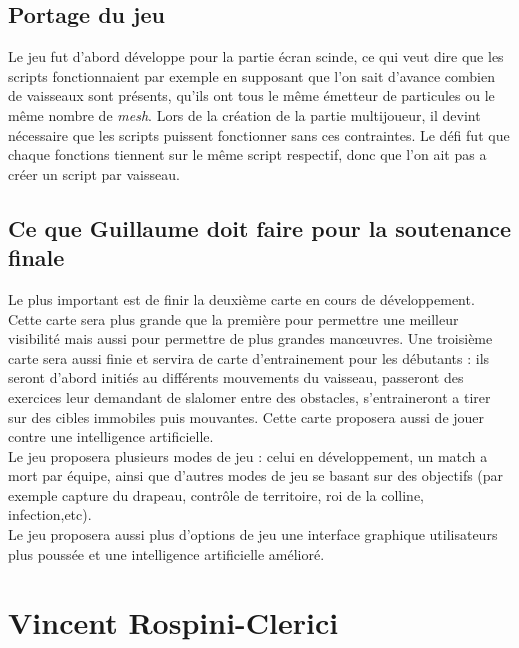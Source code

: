 \documentclass[10pt, titlepage]{report}
\begin{document}
\subsection{Portage du jeu}

Le jeu fut d'abord développe pour la partie écran scinde, ce qui veut dire que les scripts fonctionnaient par exemple en supposant que l'on sait d'avance combien de vaisseaux sont présents, qu'ils ont tous le même émetteur de particules  ou le même nombre de \textit{mesh}. Lors de la création de la partie multijoueur, il devint nécessaire que les scripts puissent fonctionner sans ces contraintes. Le défi fut que chaque fonctions tiennent sur le même script respectif, donc que l'on ait pas a créer un script par vaisseau.\\


\subsection{Ce que Guillaume doit faire pour la soutenance finale}

Le plus important est de finir la deuxième carte en cours de développement. Cette carte sera plus grande que la première pour permettre une meilleur visibilité mais aussi pour permettre de plus grandes manœuvres. Une troisième carte sera aussi finie et servira de  carte d'entrainement pour les débutants : ils seront d'abord initiés au différents mouvements du vaisseau, passeront des exercices leur demandant de slalomer entre des obstacles, s'entraineront a tirer sur des cibles immobiles puis mouvantes. Cette carte proposera aussi de jouer contre une intelligence artificielle.\\

Le jeu proposera plusieurs modes de jeu : celui en développement, un match a mort par équipe, ainsi que d'autres modes de jeu se basant sur des objectifs (par exemple capture du drapeau, contrôle de territoire, roi de la colline, infection,etc).\\

Le jeu proposera aussi plus d'options de jeu une interface graphique utilisateurs plus poussée et une intelligence artificielle amélioré.\\

\section{Vincent Rospini-Clerici}
\end{document}
